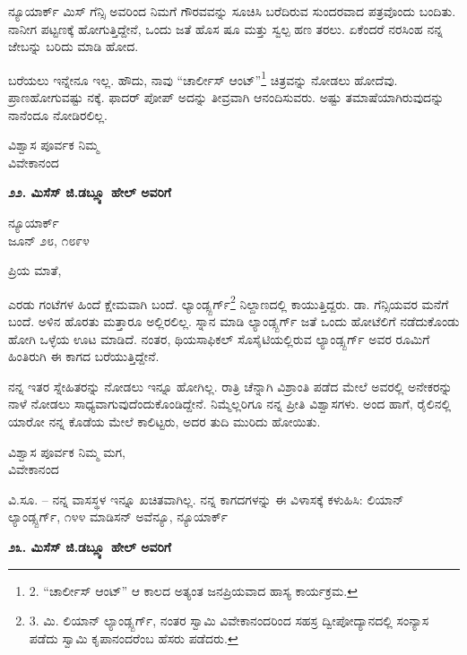 ನ್ಯೂಯಾರ್ಕ್ ಮಿಸ್ ಗೆನ್ಸಿ ಅವರಿಂದ ನಿಮಗೆ ಗೌರವವನ್ನು ಸೂಚಿಸಿ ಬರೆದಿರುವ ಸುಂದರವಾದ ಪತ್ರವೊಂದು ಬಂದಿತು. ನಾನೀಗ ಪಟ್ಟಣಕ್ಕೆ ಹೋಗುತ್ತಿದ್ದೇನೆ, ಒಂದು ಜತೆ ಹೊಸ ಷೂ ಮತ್ತು ಸ್ವಲ್ಪ ಹಣ ತರಲು. ಏಕೆಂದರೆ ನರಸಿಂಹ ನನ್ನ ಜೇಬನ್ನು ಬರಿದು ಮಾಡಿ ಹೋದ.

ಬರೆಯಲು ಇನ್ನೇನೂ ಇಲ್ಲ. ಹೌದು, ನಾವು “ಚಾರ್ಲೀಸ್ ಆಂಟ್”\footnote{2. “ಚಾರ್ಲೀಸ್ ಆಂಟ್” ಆ ಕಾಲದ ಅತ್ಯಂತ ಜನಪ್ರಿಯವಾದ ಹಾಸ್ಯ ಕಾರ್ಯಕ್ರಮ.} ಚಿತ್ರವನ್ನು ನೋಡಲು ಹೋದೆವು. ಪ್ರಾಣಹೋಗುವಷ್ಟು ನಕ್ಕೆ. ಫಾದರ್ ಪೋಪ್ ಅದನ್ನು ತೀವ್ರವಾಗಿ ಆನಂದಿಸುವರು. ಅಷ್ಟು ತಮಾಷೆಯಾಗಿರುವುದನ್ನು ನಾನೆಂದೂ ನೋಡಿರಲಿಲ್ಲ.

\begin{flushright}
ವಿಶ್ವಾಸ ಪೂರ್ವಕ ನಿಮ್ಮ\\ವಿವೇಕಾನಂದ
\end{flushright}

\begin{center}
\textbf{೨೨. ಮಿಸೆಸ್ ಜಿ.ಡಬ್ಲ್ಯೂ ಹೇಲ್ ಅವರಿಗೆ}
\end{center}

\begin{flushright}
ನ್ಯೂಯಾರ್ಕ್\\ಜೂನ್ ೨೮, ೧೮೯೪
\end{flushright}

ಪ್ರಿಯ ಮಾತೆ,

ಎರಡು ಗಂಟೆಗಳ ಹಿಂದೆ ಕ್ಷೇಮವಾಗಿ ಬಂದೆ. ಲ್ಯಾಂಡ್ಸ್ಬರ್ಗ್\footnote{3. ಮಿ. ಲಿಯಾನ್ ಲ್ಯಾಂಡ್ಸ್ಬರ್ಗ್, ನಂತರ ಸ್ವಾಮಿ ವಿವೇಕಾನಂದರಿಂದ ಸಹಸ್ರ ದ್ವೀಪೋದ್ಯಾನದಲ್ಲಿ ಸಂನ್ಯಾಸ ಪಡೆದು ಸ್ವಾಮಿ ಕೃಪಾನಂದರೆಂಬ ಹೆಸರು ಪಡೆದರು.} ನಿಲ್ದಾಣದಲ್ಲಿ ಕಾಯುತ್ತಿದ್ದರು. ಡಾ. ಗೆನ್ಸಿಯವರ ಮನೆಗೆ ಬಂದೆ. ಅಳಿನ ಹೊರತು ಮತ್ತಾರೂ ಅಲ್ಲಿರಲಿಲ್ಲ. ಸ್ನಾನ ಮಾಡಿ ಲ್ಯಾಂಡ್ಸ್ಬರ್ಗ್ ಜತೆ ಒಂದು ಹೋಟೆಲಿಗೆ ನಡೆದುಕೊಂಡು ಹೋಗಿ ಒಳ್ಳೆಯ ಊಟ ಮಾಡಿದೆ. ನಂತರ, ಥಿಯಸಾಫಿಕಲ್ ಸೊಸೈಟಿಯಲ್ಲಿರುವ ಲ್ಯಾಂಡ್ಸ್ಬರ್ಗ್ ಅವರ ರೂಮಿಗೆ ಹಿಂತಿರುಗಿ ಈ ಕಾಗದ ಬರೆಯುತ್ತಿದ್ದೇನೆ.

ನನ್ನ ಇತರ ಸ್ನೇಹಿತರನ್ನು ನೋಡಲು ಇನ್ನೂ ಹೋಗಿಲ್ಲ. ರಾತ್ರಿ ಚೆನ್ನಾಗಿ ವಿಶ್ರಾಂತಿ ಪಡೆದ ಮೇಲೆ ಅವರಲ್ಲಿ ಅನೇಕರನ್ನು ನಾಳೆ ನೋಡಲು ಸಾಧ್ಯವಾಗುವುದೆಂದುಕೊಂಡಿದ್ದೇನೆ. ನಿಮ್ಮೆಲ್ಲರಿಗೂ ನನ್ನ ಪ್ರೀತಿ ವಿಶ್ವಾಸಗಳು. ಅಂದ ಹಾಗೆ, ರೈಲಿನಲ್ಲಿ ಯಾರೋ ನನ್ನ ಕೊಡೆಯ ಮೇಲೆ ಕಾಲಿಟ್ಟರು, ಅದರ ತುದಿ ಮುರಿದು ಹೋಯಿತು.

\begin{flushright}
ವಿಶ್ವಾಸ ಪೂರ್ವಕ ನಿಮ್ಮ ಮಗ,\\ವಿವೇಕಾನಂದ
\end{flushright}

ವಿ.ಸೂ. – ನನ್ನ ವಾಸಸ್ಥಳ ಇನ್ನೂ ಖಚಿತವಾಗಿಲ್ಲ. ನನ್ನ ಕಾಗದಗಳನ್ನು ಈ ವಿಳಾಸಕ್ಕೆ ಕಳುಹಿಸಿ:  ಲಿಯಾನ್ ಲ್ಯಾಂಡ್ಸ್ಬರ್ಗ್, ೧೪೪ ಮಾಡಿಸನ್ ಅವೆನ್ಯೂ, ನ್ಯೂಯಾರ್ಕ್

\begin{center}
\textbf{೨೩. ಮಿಸೆಸ್ ಜಿ.ಡಬ್ಲ್ಯೂ ಹೇಲ್ ಅವರಿಗೆ}
\end{center}

